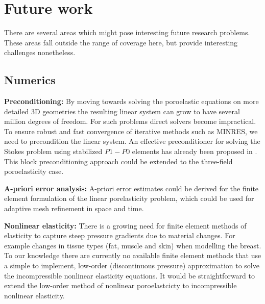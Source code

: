 \section{Future work}
There are several areas which might pose interesting future research problems. These areas fall outside the range of coverage here, but provide interesting challenges nonetheless.

\subsection{Numerics}


\textbf{Preconditioning:} By moving towards solving the poroelastic equations on more detailed 3D geometries the resulting linear system can grow to have several million degrees of freedom. For such problems direct solvers become impractical. To ensure robust and fast convergence of iterative methods such as MINRES, we need to precondition the linear system. An effective preconditioner for solving the Stokes problem using stabilized $P1-P0$ elements has already been proposed in \cite{wathen1993fast,silvester1994fast}. This block preconditioning approach could be extended to the three-field poroelasticity case. \newline

\noindent \textbf{A-priori error analysis:} A-priori error estimates could be derived for the finite element formulation of the linear porelasticity problem, which could be used for adaptive mesh refinement in space and time. \newline



\noindent \textbf{Nonlinear elasticity:} There is a growing need for finite element methods of elasticity to capture steep pressure gradients due to material changes. For example changes in tissue types (fat, muscle and skin) when modelling the breast. To our knowledge there are currently no available finite element methods that use a simple to implement, low-order (discontinuous pressure) approximation to solve the incompressible nonlinear  elasticity equations. It would be straightforward to extend the low-order method of nonlinear poroelastcicty to incompressible nonlinear elasticity. 




